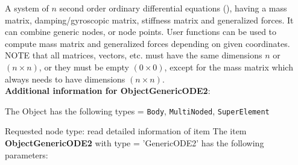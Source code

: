\label{sec:item:ObjectGenericODE2}
A system of $n$ second order ordinary differential equations (), having a mass matrix, damping/gyroscopic matrix, stiffness matrix and generalized forces. It can combine generic nodes, or node points. User functions can be used to compute mass matrix and generalized forces depending on given coordinates. NOTE that all matrices, vectors, etc. must have the same dimensions $n$ or $(n \times n)$, or they must be empty $(0 \times 0)$, except for the mass matrix which always needs to have dimensions $(n \times n)$.\vspace{12pt}
 \\{\bf Additional information for ObjectGenericODE2}:
\bi
  \item The Object has the following types = \texttt{Body}, \texttt{MultiNoded}, \texttt{SuperElement}
  \item Requested node type: read detailed information of item
\ei
\vspace{12pt} \noindent The item {\bf ObjectGenericODE2} with type = 'GenericODE2' has the following parameters:\vspace{-1cm}\\ 
